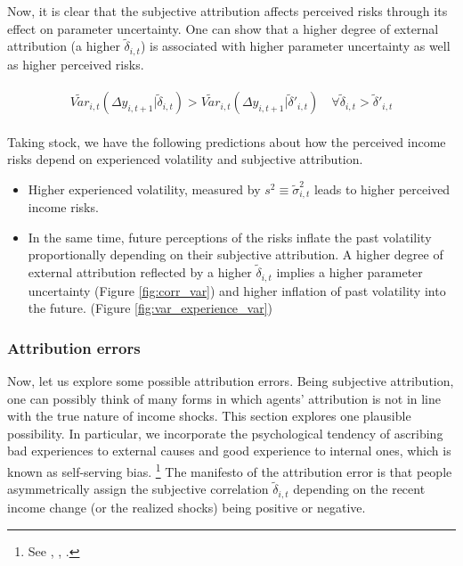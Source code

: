 \documentclass[12pt,notitlepage,onecolumn,aps,pra]{article}
\begin{document}
Now, it is clear that the subjective attribution affects perceived risks
through its effect on parameter uncertainty. One can show that a higher
degree of external attribution (a higher \(\tilde \delta_{i,t}\)) is
associated with higher parameter uncertainty as well as higher perceived
risks.

\begin{eqnarray}
\begin{split}
\tilde {Var}_{i,t}(\Delta y_{i,t+1}|\tilde \delta_{i,t}) >  \tilde {Var}_{i,t}(\Delta y_{i,t+1}|\tilde \delta'_{i,t}) \quad \forall \tilde \delta_{i,t} > \tilde \delta'_{i,t}
\end{split}
\end{eqnarray}

Taking stock, we have the following predictions about how the perceived
income risks depend on experienced volatility and subjective
attribution.

\begin{itemize}
\item
  Higher experienced volatility, measured by
  \(s^2 \equiv \tilde{\sigma}^2_{i,t}\) leads to higher perceived income
  risks.
\item
  In the same time, future perceptions of the risks inflate the past
  volatility proportionally depending on their subjective attribution. A
  higher degree of external attribution reflected by a higher
  \(\tilde \delta_{i,t}\) implies a higher parameter uncertainty (Figure
  \ref{fig:corr_var}) and higher inflation of past volatility into the
  future. (Figure \ref{fig:var_experience_var})
\end{itemize}



    \hypertarget{attribution-errors}{%
\subsubsection{Attribution errors}\label{attribution-errors}}

Now, let us explore some possible attribution errors. Being subjective
attribution, one can possibly think of many forms in which agents'
attribution is not in line with the true nature of income shocks. This
section explores one plausible possibility. In particular, we
incorporate the psychological tendency of ascribing bad experiences to
external causes and good experience to internal ones, which is known as
self-serving bias.
\footnote{See \cite{al1993attributional}, \cite{campbell1999self}, \cite{seidel2010blame}.}
The manifesto of the attribution error is that people asymmetrically
assign the subjective correlation \(\tilde \delta_{i,t}\) depending on
the recent income change (or the realized shocks) being positive or
negative.
\end{document}
